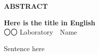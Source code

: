
% 
\textbf{\Large ABSTRACT}
    \begin{center}
    \textbf{\large Here is the title in English}\\
    〇〇 Laboratory　Name
    \end{center}

Sentence here


% 